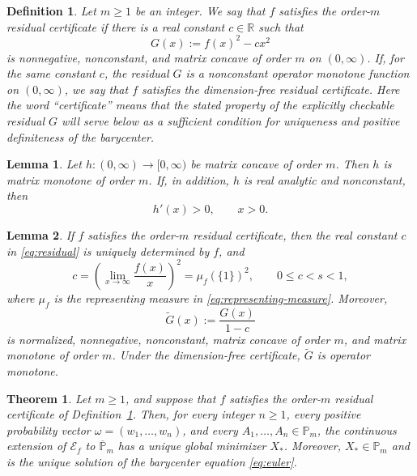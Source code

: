 \documentclass[10pt,a4paper]{amsart}
\newtheorem{definition}{Definition}
\newtheorem{lemma}{Lemma}
\newtheorem{theorem}{Theorem}
\newcommand{\Pm}{\mathbb P_m}
\begin{document}
\begin{definition}\label{def:certificate}
		Let $m\ge1$ be an integer.  We say that $f$ satisfies the
		\emph{order-$m$ residual certificate} if there is a real constant
		$c\in\mathbb R$ such that
		\begin{equation}\label{eq:residual}
			G(x):=f(x)^2-cx^2
		\end{equation}
		is nonnegative, nonconstant, and matrix concave of order $m$ on
		$(0,\infty)$.  If, for the same constant $c$, the residual $G$ is a
		nonconstant operator monotone function on $(0,\infty)$, we say that $f$
		satisfies the \emph{dimension-free residual certificate}.  Here the word
		``certificate'' means that the stated property of the explicitly
		checkable residual $G$ will serve below as a sufficient condition for
		uniqueness and positive definiteness of the barycenter.
\end{definition}

\begin{lemma}
	\label{lem:positive-matrix-concavity}
	Let $h:(0,\infty)\to[0,\infty)$ be matrix concave of order $m$.
	Then $h$ is matrix monotone of order $m$.  If, in addition, $h$
	is real analytic and nonconstant, then
	\[
	h'(x)>0,\qquad x>0.
	\]
\end{lemma}

	\begin{lemma}
		\label{lem:certificate-constant}
	 If $f$ satisfies the order-$m$ residual certificate, then the real
		constant $c$ in \eqref{eq:residual} is uniquely determined by $f$, and
		\begin{equation}\label{eq:canonical-c}
			c=\left(\lim_{x\to\infty}\frac{f(x)}{x}\right)^2
			=\mu_f(\{1\})^2,
			\qquad 0\le c<s<1,
		\end{equation}
		where $\mu_f$ is the representing measure in
		\eqref{eq:representing-measure}.  Moreover,
		\begin{equation}\label{eq:normalized-residual}
			\widetilde G(x):=\frac{G(x)}{1-c}
		\end{equation}
		is normalized, nonnegative, nonconstant, matrix concave of order $m$, and
		matrix monotone of order $m$.  Under the dimension-free certificate,
		$\widetilde G$ is operator monotone.
	\end{lemma}

\begin{theorem}
	\label{thm:certificate}
	Let $m\ge1$, and suppose that $f$ satisfies the order-$m$ residual
	certificate of Definition~\ref{def:certificate}.  Then, for every
	integer $n\ge1$, every positive probability vector
	$\omega=(w_1,\ldots,w_n)$, and every
	$A_1,\ldots,A_n\in\Pm$, the continuous extension of
	$\mathcal E_f$ to $\overline{\mathbb{P}}_m$ has a unique global minimizer
	$X_*$.  Moreover, $X_*\in\Pm$ and is the unique solution of the
	barycenter equation \eqref{eq:euler}.
\end{theorem}
\end{document}
